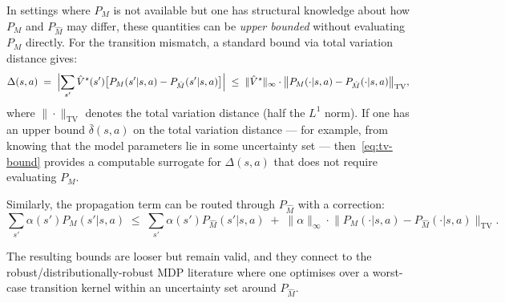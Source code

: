 \documentclass[11pt]{article}
\newcommand{\Vhatstar}{\hat V^\star}
\begin{document}
In settings where $P_M$ is not available but one has structural knowledge
about how $P_M$ and $P_{\hat M}$ may differ, these quantities can be
\emph{upper bounded} without evaluating $P_M$ directly.  For the transition
mismatch, a standard bound via total variation distance gives:
\begin{equation}\label{eq:tv-bound}
  \Delta(s,a)
  \;=\; \Bigl|\sum_{s'} \Vhatstar(s')\bigl[P_M(s'|s,a) - P_{\hat M}(s'|s,a)\bigr]\Bigr|
  \;\le\; \|\Vhatstar\|_\infty \cdot
          \bigl\|P_M(\cdot|s,a) - P_{\hat M}(\cdot|s,a)\bigr\|_{\mathrm{TV}},
\end{equation}
where $\|\cdot\|_{\mathrm{TV}}$ denotes the total variation distance (half the
$L^1$ norm).  If one has an upper bound $\bar\delta(s,a)$ on the total
variation distance --- for example, from knowing that the model parameters lie
in some uncertainty set --- then~\eqref{eq:tv-bound} provides a computable
surrogate for $\Delta(s,a)$ that does not require evaluating $P_M$.

Similarly, the propagation term can be routed through $P_{\hat M}$ with a
correction:
\[
  \sum_{s'} \alpha(s') P_M(s'|s,a)
  \;\le\; \sum_{s'} \alpha(s') P_{\hat M}(s'|s,a)
  \;+\; \|\alpha\|_\infty \cdot
        \bigl\|P_M(\cdot|s,a) - P_{\hat M}(\cdot|s,a)\bigr\|_{\mathrm{TV}}.
\]

The resulting bounds are looser but remain valid, and they connect to the
robust/distributionally-robust MDP literature where one optimises over a
worst-case transition kernel within an uncertainty set around $P_{\hat M}$.
\end{document}
